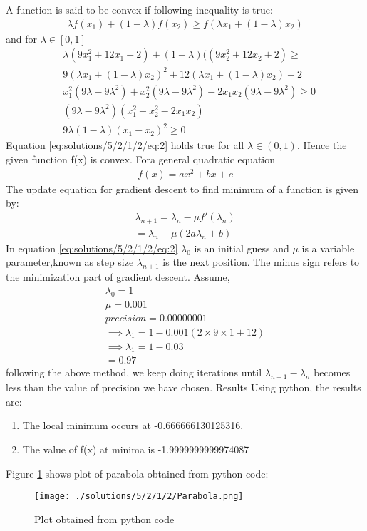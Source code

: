  A function is said to be convex if following inequality is true:
\begin{align}
    \lambda f(x_1)+(1-\lambda) f(x_2) \geq f(\lambda x_1+(1-\lambda) x_2)
\end{align}
and for $\lambda \in [0,1]$
\begin{align}
&\lambda(9x_1^2+12x_1+2)+(1-\lambda)((9x_2^2+12x_2+2) \geq \nonumber \\ 
&9(\lambda x_1 +(1-\lambda )x_2)^2+12(\lambda x_1 +(1-\lambda )x_2)+2\\
&x_1^2(9\lambda-9\lambda^2)+x_2^2(9\lambda-9\lambda^2)-2x_1x_2(9\lambda-9\lambda^2) \geq 0\\
&(9\lambda-9\lambda^2)(x_1^2+x_2^2-2x_1x_2)\\
&9\lambda(1-\lambda)(x_1-x_2)^2 \geq 0 \label{eq:solutions/5/2/1/2/eq:2}
\end{align}
Equation \eqref{eq:solutions/5/2/1/2/eq:2} holds true for all $\lambda\in(0,1)$. Hence the given function f(x) is convex.
 Fora general quadratic equation
\begin{align}
    f(x)=ax^2+bx+c
\end{align}
The update equation for gradient descent to find minimum of a function is given by:
\begin{align}
    \lambda_{n+1}=\lambda_n-\mu f'(\lambda_n) 
\\
    =\lambda_n-\mu (2a\lambda_n +b)
\end{align}
In equation \eqref{eq:solutions/5/2/1/2/eq:2} $\lambda_0$ is an initial guess and $\mu$ is a variable parameter,known as step size $\lambda_{n+1}$ is the next position. The minus sign refers to the minimization part of gradient descent.
 Assume,
\begin{align}
    \lambda_0=1\\
    \mu=0.001 \\
    precision = 0.00000001\\
    \implies \lambda_1=1-0.001(2\times9\times1+12)\\
    \implies \lambda_1=1-0.03\\
    =0.97
\end{align}
following the above method, we keep doing iterations until $\lambda_{n+1}-\lambda_{n}$ becomes less than the value of precision we have chosen.
{Results}
Using python, the results are:
\begin{enumerate}
	\item The local minimum occurs at -0.666666130125316.
	\item The value of f(x) at minima is -1.9999999999974087
\end{enumerate}
Figure \ref{eq:solutions/5/2/1/2/Fig:1} shows plot of parabola obtained from python code:
\begin{figure}[h]
\renewcommand{\theenumi}{1}
\centering
\texttt{[image: ./solutions/5/2/1/2/Parabola.png]}
\caption{Plot obtained from python code}
\label{eq:solutions/5/2/1/2/Fig:1}
\end{figure}
